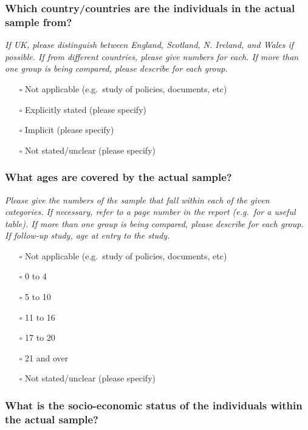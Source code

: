 \documentclass[
  doc, a4paper]{apa7}
\providecommand{\tightlist}{%
  \setlength{\itemsep}{0pt}\setlength{\parskip}{0pt}}
\begin{document}
\subsubsection{Which country/countries are the individuals in the actual sample from?}\label{which-countrycountries-are-the-individuals-in-the-actual-sample-from}

\emph{If UK, please distinguish between England, Scotland, N. Ireland, and Wales if possible. If from different countries, please give numbers for each. If more than one group is being compared, please describe for each group.}

\begin{itemize}
\tightlist
\item[$\square$]
  Not applicable (e.g.~study of policies, documents, etc)
\item[$\square$]
  Explicitly stated (please specify)
\item[$\square$]
  Implicit (please specify)
\item[$\square$]
  Not stated/unclear (please specify)
\end{itemize}

\subsubsection{What ages are covered by the actual sample?}\label{what-ages-are-covered-by-the-actual-sample}

\emph{Please give the numbers of the sample that fall within each of the given categories. If necessary, refer to a page number in the report (e.g.~for a useful table). If more than one group is being compared, please describe for each group. If follow-up study, age at entry to the study.}

\begin{itemize}
\tightlist
\item[$\square$]
  Not applicable (e.g.~study of policies, documents, etc)
\item[$\square$]
  0 to 4
\item[$\square$]
  5 to 10
\item[$\square$]
  11 to 16
\item[$\square$]
  17 to 20
\item[$\square$]
  21 and over
\item[$\square$]
  Not stated/unclear (please specify)
\end{itemize}

\subsubsection{What is the socio-economic status of the individuals within the actual sample?}\label{what-is-the-socio-economic-status-of-the-individuals-within-the-actual-sample}
\end{document}
